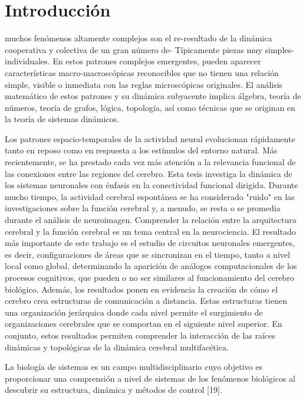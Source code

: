 \chapter{Introducción}




muchos fenómenos altamente complejos son el re-resultado de la dinámica cooperativa y colectiva de un gran número de- Típicamente piezas muy simples-individuales. En estos patrones complejos emergentes, pueden aparecer características macro-macroscópicas reconocibles que no tienen una relación simple, visible o inmediata con las reglas microscópicas originales. El análisis matemático de estos patrones y su dinámica subyacente implica álgebra, teoría de números, teoría de grafos, lógica, topología, así como técnicas que se originan en la teoría de sistemas dinámicos.



Los patrones espacio-temporales de la actividad neural evolucionan rápidamente tanto en reposo como en respuesta a los estímulos del entorno natural.
Más recientemente, se ha prestado cada vez más atención a la relevancia funcional de las conexiones entre las regiones del cerebro. Esta tesis investiga la dinámica de los sistemas neuronales con énfasis en la conectividad funcional dirigida.
Durante mucho tiempo, la actividad cerebral espontánea se ha considerado "ruido" en las investigaciones sobre la función cerebral y, a menudo, se resta o se promedia durante el análisis de neuroimagen.
Comprender la relación entre la arquitectura cerebral y la función cerebral es un tema central en la neurociencia.
El resultado más importante de este trabajo es el estudio de circuitos neuronales emergentes, es decir, configuraciones de áreas que se sincronizan en el tiempo, tanto a nivel local como global, determinando la aparición de análogos computacionales de los procesos cognitivos, que pueden o no ser similares al funcionamiento del cerebro biológico. Además, los resultados ponen en evidencia la creación de cómo el cerebro crea estructuras de comunicación a distancia. Estas estructuras tienen una organización jerárquica donde cada nivel permite el surgimiento de organizaciones cerebrales que se comportan en el siguiente nivel superior. En conjunto, estos resultados permiten comprender la interacción de las raíces dinámicas y topológicas de la dinámica cerebral multifacética.

La biología de sistemas es un campo multidisciplinario cuyo objetivo es proporcionar una comprensión a nivel de sistemas de los fenómenos biológicos al descubrir su estructura, dinámica y métodos de control [19].

